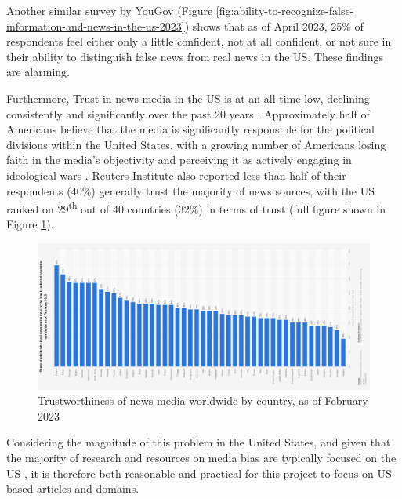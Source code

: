 Another similar survey by YouGov \cite{yougov-2023-confidence} (Figure \ref{fig:ability-to-recognize-false-information-and-news-in-the-us-2023}) shows that as of April 2023, 25\% of respondents feel either only a little confident, not at all confident, or not sure in their ability to distinguish false news from real news in the US. These findings are alarming.

Furthermore, Trust in news media in the US is at an all-time low, declining consistently and significantly over the past 20 years \cite{pew-2021-partisan-divides, gallup-knight-2020-american-views, reuters-2023-digital-news-report}. Approximately half of Americans believe that the media is significantly responsible for the political divisions within the United States, with a growing number of Americans losing faith in the media's objectivity and perceiving it as actively engaging in ideological wars \cite{gallup-knight-2020-american-views}. Reuters Institute also reported less than half of their respondents (40\%) generally trust the majority of news sources, with the US ranked on 29\textsuperscript{th} out of 40 countries (32\%) in terms of trust \cite{reuters-2023-digital-news-report,reuters-2023-trust} (full figure shown in Figure \ref{fig:trustworthiness-of-news-media-worldwide-2023}).

\begin{figure}[htbp]
    \centering
    \includegraphics[width=1\linewidth]{images/statistic_id308468_trustworthiness-of-news-media-worldwide-2023.png}
    \caption{Trustworthiness of news media worldwide by country, as of February 2023 \cite{reuters-2023-trust}}
    \label{fig:trustworthiness-of-news-media-worldwide-2023}
\end{figure}

Considering the magnitude of this problem in the United States, and given that the majority of research and resources on media bias are typically focused on the US \cite{allsides, adfontes,rodrigo-2024-systematic-review-media-bias}, it is therefore both reasonable and practical for this project to focus on US-based articles and domains.


